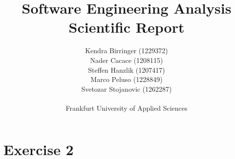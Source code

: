 \documentclass{article}
\begin{document}


\title{Software Engineering Analysis Scientific Report}

\author{Kendra Birringer (1229372) \\ Nader Cacace (1208115) \\ Steffen Hanzlik (1207417) \\ Marco Peluso (1228849) \\ Svetozar Stojanovic (1262287)\\
  \\
Frankfurt University of Applied Sciences \\}


\maketitle              %
\tableofcontents
\listoffigures
\newpage
\section{Exercise 2}
\end{document}
